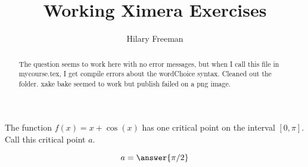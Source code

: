 \documentclass[handout]{ximera}
\title{Working Ximera Exercises}
\author{Hilary Freeman}
\begin{document}
\begin{abstract}
  The question seems to work here with no error messages, but when I call this file in mycourse.tex, I get compile errors about the wordChoice syntax.  Cleaned out the folder. xake bake seemed to work but publish failed on a png image.
\end{abstract}
\maketitle



\begin{exercise}
The function $f(x) =x+\cos(x)$ has one critical point on the interval $[0,\pi]$. Call this critical point $a$.

$$
a = \answer{\pi/2}
$$




\end{exercise}
\end{document}

